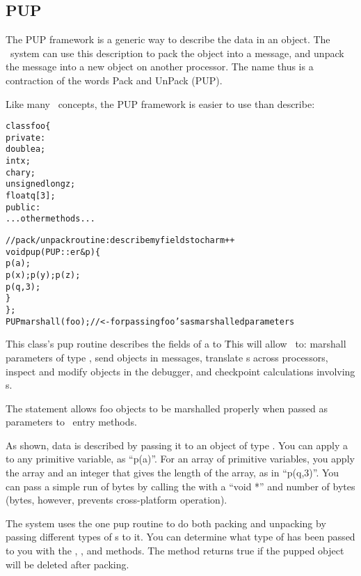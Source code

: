 \subsection{PUP}

The  PUP framework is a generic way to describe the data in an object.
The \charmpp\ system can use this description to pack the object 
into a message, and unpack the message into a new object on another 
processor.
The name thus is a contraction of the words Pack and UnPack (PUP).

Like many \CC\ concepts, the PUP framework is easier to use than 
describe: 

\begin{alltt}
class foo \{
 private:
    double a;
    int x;
    char y;
    unsigned long z;
    float q[3];
 public:
    ...other methods...

    //pack/unpack routine: describe my fields to charm++
    void pup(PUP::er &p) \{
      p(a);
      p(x);p(y);p(z);
      p(q,3);
    \}
\};
PUPmarshall(foo); //<- for passing foo's as marshalled parameters
\end{alltt}

This class's pup routine describes the fields of a  to \charmpp\.
This will allow \charmpp\ to: marshall parameters of type ,
send  objects in messages, translate s across processors,
inspect and modify  objects in the debugger, and checkpoint 
calculations involving s.

The  statement allows foo objects to be
marshalled properly when passed as parameters to \charmpp\ entry methods.

As shown, data is described by passing it to an object of type 
 .  You can apply a  to any 
primitive variable, as ``p(a)''.
For an array of primitive variables, you apply the array and an integer
that gives the length of the array, as in ``p(q,3)''.  You can pass a 
simple run of bytes 
by calling the  with a ``void *'' and number of bytes
(bytes, however, prevents cross-platform operation).

The system uses the one pup routine to do both packing and unpacking by
passing different types of s to it.  You can determine
what type of  has been passed to you with the
, , and  methods.
The  method returns true if the pupped object
will be deleted after packing.

